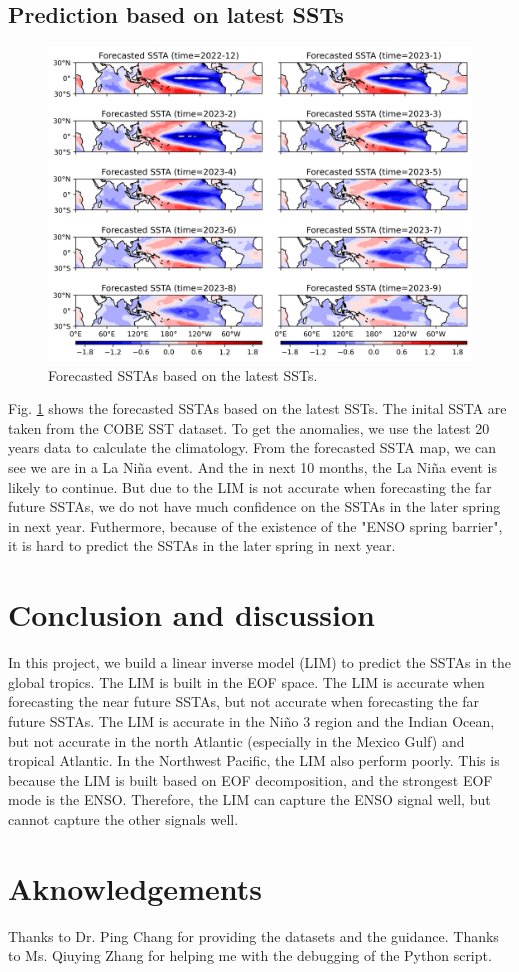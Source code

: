 \documentclass[12pt,a4paper]{article}
\begin{document}
\subsection{Prediction based on latest SSTs}\label{prediction-latest-ssts}

\begin{figure}
\centering
\includegraphics[width=\textwidth]{figures/forecasted_ssta_newest.png}
\caption{Forecasted SSTAs based on the latest SSTs.}
\label{fig:forecasted_ssta_newest}
\end{figure}

Fig. \ref{fig:forecasted_ssta_newest} shows the forecasted SSTAs based on the latest SSTs. The inital SSTA are taken from the COBE SST dataset. To get the anomalies, we use the latest 20 years data to calculate the climatology. From the forecasted SSTA map, we can see we are in a La Ni\~na event. And the in next 10 months, the La Ni\~na event is likely to continue. But due to the LIM is not accurate when forecasting the far future SSTAs, we do not have much confidence on the SSTAs in the later spring in next year. Futhermore, because of the existence of the "ENSO spring barrier", it is hard to predict the SSTAs in the later spring in next year.

\section{Conclusion and discussion}\label{conclusion}

In this project, we build a linear inverse model (LIM) to predict the SSTAs in the global tropics. The LIM is built in the EOF space. The LIM is accurate when forecasting the near future SSTAs, but not accurate when forecasting the far future SSTAs. The LIM is accurate in the Ni\~no 3 region and the Indian Ocean, but not accurate in the north Atlantic (especially in the Mexico Gulf) and tropical Atlantic. In the Northwest Pacific, the LIM also perform poorly. This is because the LIM is built based on EOF decomposition, and the strongest EOF mode is the ENSO. Therefore, the LIM can capture the ENSO signal well, but cannot capture the other signals well.

\section{Aknowledgements}\label{acknowledgements}

Thanks to Dr. Ping Chang for providing the datasets and the guidance. Thanks to Ms. Qiuying Zhang for helping me with the debugging of the Python script.



\end{document}
